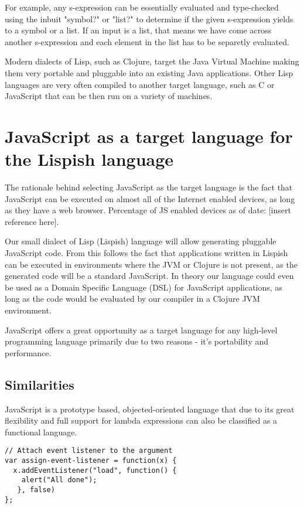 For example, any s-expression can be essentially evaluated and type-checked using the inbuit "symbol?" or "list?" to determine if the given s-expression yields to a symbol or a list. If an input is a list, that means we have come across another s-expression and each element in the list has to be separetly evaluated. 

Modern dialects of Lisp, such as Clojure, target the Java Virtual Machine making them very portable and pluggable into an existing Java applications.
Other Lisp languages are very often compiled to another target language, such as C or JavaScript that can be then run on a variety of machines. 

\section{JavaScript as a target language for the Lispish language}
The rationale behind selecting JavaScript as the target language is the fact that JavaScript can be executed on almost all of the Internet enabled devices, as long as they have a web browser. Percentage of JS enabled devices as of date: [insert reference here].

Our small dialect of Lisp (Lispish) language will allow generating pluggable JavaScript code. 
From this follows the fact that applications written in Lispish can be executed in environments where the JVM or Clojure is not present, as the generated code will be a standard JavaScript.
In theory our language could even be used as a Domain Specific Language (DSL) for JavaScript applications, as long as the code would be evaluated by our compiler in a Clojure JVM environment.

JavaScript offers a great opportunity as a target language for any high-level programming language primarily due to two reasons - it's portability and performance. 

\subsection{Similarities}
JavaScript is a prototype based, objected-oriented language that due to its great flexibility and full support for lambda expressions can also be classified as a functional language.

\begin{lstlisting}
// Attach event listener to the argument
var assign-event-listener = function(x) {
  x.addEventListener("load", function() { 
  	alert("All done"); 
   }, false)
};
\end{lstlisting}

